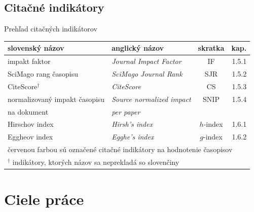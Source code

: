 \documentclass{beamer}
\begin{document}
%
%


\subsection{Citačné indikátory}

%
%
\begin{frame}{Prehľad citačných indikátorov}
  \begin{table}
    \centering\footnotesize
    \begin{tabular}{llcr}
      \toprule
      slovenský názov & anglický názov & skratka & kap. \\
      \midrule
      \rowcolor{LRed} impakt faktor                 & \emph{Journal Impact Factor}    & IF        & 1.5.1 \\[0.5ex]
      \rowcolor{LRed} SciMago rang časopisu         & \emph{SciMago Journal Rank}     & SJR       & 1.5.2 \\[0.5ex]
      \rowcolor{LRed} CiteScore$^\dagger$            & \emph{CiteScore}                & CS        & 1.5.3 \\[0.5ex]
      \rowcolor{LRed} normalizovaný impakt časopisu & \emph{Source normalized impact} & SNIP      & 1.5.4 \\[-0.25ex]
      \rowcolor{LRed} na dokument                   & \emph{per paper}                &           &       \\[0.5ex]
      Hirschov index                                & \emph{Hirsh's index}            & $h$-index & 1.6.1 \\[1.5ex]
      Eggheov index                                 & \emph{Egghe's index}            & $g$-index & 1.6.2 \\[0.5ex]
      \bottomrule
      \multicolumn{4}{l}{\tiny {\color{red} červenou farbou} sú označené citačné indikátory na hodnotenie časopisov} \\
      \multicolumn{4}{l}{\tiny $^\dagger$ indikátory, ktorých názov sa neprekladá so slovenčiny}
    \end{tabular}
  \end{table}
\end{frame}


\section{Ciele práce}
\end{document}
